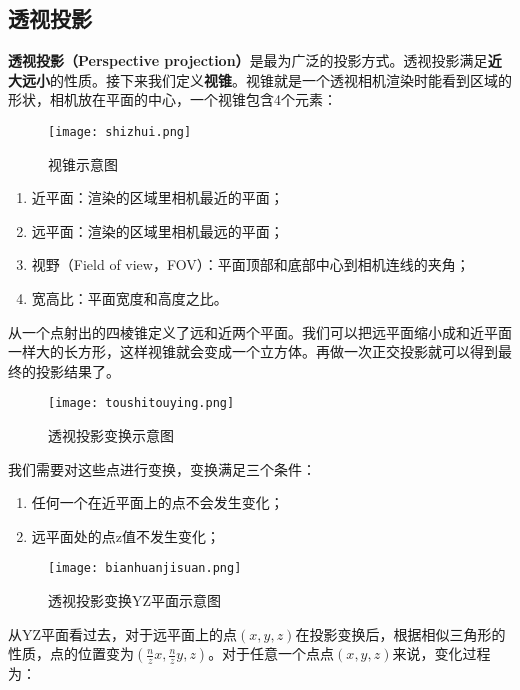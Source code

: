 \documentclass[openany]{progbookcn}
\begin{document}
\subsection{透视投影}

\textbf{透视投影（Perspective projection）}是最为广泛的投影方式。透视投影满足\textbf{近大远小}的性质。接下来我们定义\textbf{视锥}。视锥就是一个透视相机渲染时能看到区域的形状，相机放在平面的中心，一个视锥包含4个元素：

\begin{figure}[H]
	\centering
	\texttt{[image: shizhui.png]}
	\caption{视锥示意图}
	\label{fig:projection}
\end{figure}

\begin{enumerate}
	\item 近平面：渲染的区域里相机最近的平面；
	\item 远平面：渲染的区域里相机最远的平面；
	\item 视野（Field of view，FOV）：平面顶部和底部中心到相机连线的夹角；
	\item 宽高比：平面宽度和高度之比。
\end{enumerate}

从一个点射出的四棱锥定义了远和近两个平面。我们可以把远平面缩小成和近平面一样大的长方形，这样视锥就会变成一个立方体。再做一次正交投影就可以得到最终的投影结果了。

\begin{figure}[H]
	\centering
	\texttt{[image: toushitouying.png]}
	\caption{透视投影变换示意图}
	\label{fig:projection}
\end{figure}

我们需要对这些点进行变换，变换满足三个条件：
\begin{enumerate}
	\item 任何一个在近平面上的点不会发生变化；
	\item 远平面处的点z值不发生变化；
\end{enumerate}

\begin{figure}[H]
	\centering
	\texttt{[image: bianhuanjisuan.png]}
	\caption{透视投影变换YZ平面示意图}
	\label{fig:projection}
\end{figure}

从YZ平面看过去，对于远平面上的点$(x,y,z)$在投影变换后，根据相似三角形的性质，点的位置变为$(\frac{n}{z}x,\frac{n}{z}y,z)$。对于任意一个点点$(x,y,z)$来说，变化过程为：
\end{document}
